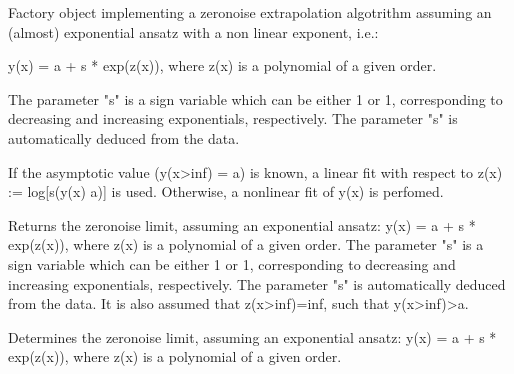 \documentclass[letterpaper,10pt,english]{sphinxmanual}
\begin{document}
\begin{fulllineitems}
\label{\detokenize{index:mitiq.factories.PolyExpFactory}}
Factory object implementing a zero\sphinxhyphen{}noise extrapolation algotrithm assuming an
(almost) exponential ansatz with a non linear exponent, i.e.:

y(x) = a + s * exp(z(x)), where z(x) is a polynomial of a given order.

The parameter "s" is a sign variable which can be either 1 or \sphinxhyphen{}1, corresponding to
decreasing and increasing exponentials, respectively. The parameter "s" is
automatically deduced from the data.

If the asymptotic value (y(x\sphinxhyphen{}\textgreater{}inf) = a) is known, a linear fit with respect
to z(x) := log{[}s(y(x) \sphinxhyphen{} a){]} is used.
Otherwise, a non\sphinxhyphen{}linear fit of y(x) is perfomed.

\begin{fulllineitems}
\label{\detokenize{index:mitiq.factories.PolyExpFactory.reduce}}
Returns the zero\sphinxhyphen{}noise limit, assuming an exponential ansatz:
y(x) = a + s * exp(z(x)), where z(x) is a polynomial of a given order.
The parameter "s" is a sign variable which can be either 1 or \sphinxhyphen{}1, corresponding to
decreasing and increasing exponentials, respectively. The parameter "s" is
automatically deduced from the data.
It is also assumed that z(x\sphinxhyphen{}\sphinxhyphen{}\textgreater{}inf)=\sphinxhyphen{}inf, such that y(x\sphinxhyphen{}\sphinxhyphen{}\textgreater{}inf)\sphinxhyphen{}\sphinxhyphen{}\textgreater{}a.

\end{fulllineitems}


\begin{fulllineitems}
\label{\detokenize{index:mitiq.factories.PolyExpFactory.static_reduce}}
Determines the zero\sphinxhyphen{}noise limit, assuming an exponential ansatz:
y(x) = a + s * exp(z(x)), where z(x) is a polynomial of a given order.


\end{fulllineitems}
\end{fulllineitems}
\end{document}
